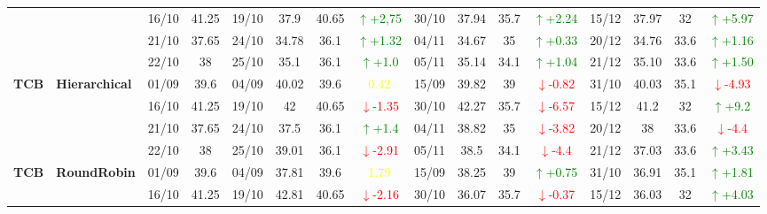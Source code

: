 \documentclass{ieeeaccess}
\begin{document}
{\begin{longtable}{llcc|cccc|cccc|cccc}
&
& 16/10 & 41.25 & 19/10 & 37.9 & 40.65 & \textcolor{green}{\(\uparrow\)+2,75} & 30/10 & 37.94 & 35.7 & \textcolor{green}{\(\uparrow\)+2.24} & 15/12 & 37.97 & 32 & \textcolor{green}{\(\uparrow\)+5.97} \\

&
& 21/10 & 37.65 & 24/10 & 34.78 & 36.1 & \textcolor{green}{\(\uparrow\)+1.32} & 04/11 & 34.67 & 35 & \textcolor{green}{\(\uparrow\)+0.33} & 20/12 & 34.76 & 33.6 &\textcolor{green}{\(\uparrow\)+1.16}\\

&
& 22/10 & 38 & 25/10 & 35.1 & 36.1 & \textcolor{green}{\(\uparrow\)+1.0} & 05/11 & 35.14 & 34.1 & \textcolor{green}{\(\uparrow\)+1.04} & 21/12 & 35.10 & 33.6 & \textcolor{green}{\(\uparrow\)+1.50} \\
\midrule


\multirow{4}{*}{\textbf{TCB}} 
& \textbf{Hierarchical}
& 01/09 & 39.6 & 04/09 & 40.02 & 39.6 & \textcolor{yellow}{0.42} & 15/09 & 39.82 & 39 & \textcolor{red}{\(\downarrow\)-0.82} & 31/10 & 40.03 & 35.1 & \textcolor{red}{\(\downarrow\)-4.93} \\

&
& 16/10 & 41.25 & 19/10 & 42 & 40.65 & \textcolor{red}{\(\downarrow\)-1.35} & 30/10 & 42.27 & 35.7 & \textcolor{red}{\(\downarrow\)-6.57} & 15/12 & 41.2 & 32 & \textcolor{green}{\(\uparrow\)+9.2} \\

&
& 21/10 & 37.65 & 24/10 & 37.5 & 36.1 & \textcolor{green}{\(\uparrow\)+1.4} & 04/11 & 38.82 & 35 & \textcolor{red}{\(\downarrow\)-3.82} & 20/12 & 38 & 33.6 &\textcolor{red}{\(\downarrow\)-4.4}\\

&
& 22/10 & 38 & 25/10 & 39.01 & 36.1 & \textcolor{red}{\(\downarrow\)-2.91} & 05/11 & 38.5 & 34.1 & \textcolor{red}{\(\downarrow\)-4.4} & 21/12 & 37.03 & 33.6 & \textcolor{green}{\(\uparrow\)+3.43} \\
\midrule



\multirow{4}{*}{\textbf{TCB}} 
& \textbf{RoundRobin}
& 01/09 & 39.6 & 04/09 & 37.81 & 39.6 & \textcolor{yellow}{1.79} & 15/09 & 38.25 & 39 & \textcolor{green}{\(\uparrow\)+0.75} & 31/10 & 36.91 & 35.1 & \textcolor{green}{\(\uparrow\)+1.81} \\

&
& 16/10 & 41.25 & 19/10 & 42.81 & 40.65 & \textcolor{red}{\(\downarrow\)-2.16} & 30/10 & 36.07 & 35.7 & \textcolor{red}{\(\downarrow\)-0.37} & 15/12 & 36.03 & 32 & \textcolor{green}{\(\uparrow\)+4.03} \\


\end{longtable}}
\end{document}
